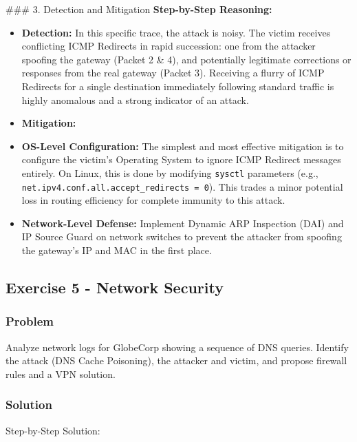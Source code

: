 \documentclass{article}
\begin{document}
\#\#\# 3. Detection and Mitigation
\textbf{Step-by-Step Reasoning:}
\begin{itemize}
    \item \textbf{Detection:} In this specific trace, the attack is noisy. The victim receives conflicting ICMP Redirects in rapid succession: one from the attacker spoofing the gateway (Packet 2 \& 4), and potentially legitimate corrections or responses from the real gateway (Packet 3). Receiving a flurry of ICMP Redirects for a single destination immediately following standard traffic is highly anomalous and a strong indicator of an attack.
    \item \textbf{Mitigation:}
    \item \textbf{OS-Level Configuration:} The simplest and most effective mitigation is to configure the victim's Operating System to ignore ICMP Redirect messages entirely. On Linux, this is done by modifying \texttt{sysctl} parameters (e.g., \texttt{net.ipv4.conf.all.accept\_redirects = 0}). This trades a minor potential loss in routing efficiency for complete immunity to this attack.
    \item \textbf{Network-Level Defense:} Implement Dynamic ARP Inspection (DAI) and IP Source Guard on network switches to prevent the attacker from spoofing the gateway's IP and MAC in the first place.
\end{itemize}

\subsection{Exercise 5 - Network Security}
\subsubsection*{Problem}
Analyze network logs for GlobeCorp showing a sequence of DNS queries. Identify the attack (DNS Cache Poisoning), the attacker and victim, and propose firewall rules and a VPN solution.

\subsubsection*{Solution}
Step-by-Step Solution:
\end{document}
